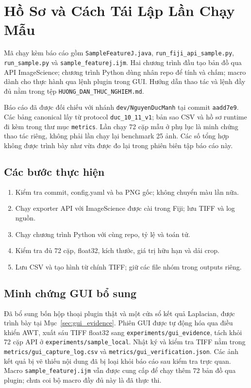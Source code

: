 \appendices
\section{Hồ Sơ và Cách Tái Lập Lần Chạy Mẫu}
Mã chạy kèm báo cáo gồm \texttt{SampleFeatureJ.java}, \texttt{run\_fiji\_api\_sample.py},
\texttt{run\_sample.py} và \texttt{sample\_featurej.ijm}.
Hai chương trình đầu tạo bản đồ qua API ImageScience; chương trình Python dùng
nhân repo để tính và chấm; macro dành cho thực hành qua lệnh plugin trong GUI.
Hướng dẫn thao tác và lệnh đầy đủ nằm trong tệp \texttt{HUONG\_DAN\_THUC\_NGHIEM.md}.

Báo cáo đã được đối chiếu với nhánh \texttt{dev/NguyenDucManh} tại commit
\texttt{aadd7e9}. Các bảng canonical lấy từ protocol \texttt{duc\_10\_11\_v1};
bản sao CSV và hồ sơ runtime đi kèm trong thư mục \texttt{metrics}. Lần chạy
72 cặp mẫu ở phụ lục là minh chứng thao tác riêng, không phải lần chạy lại
benchmark 25 ảnh. Các số tổng hợp không được trình bày như vừa được đo lại
trong phiên biên tập báo cáo này.

\subsection{Các bước thực hiện}
\begin{enumerate}
\item Kiểm tra commit, config.yaml và ba PNG gốc; không chuyển màu lần nữa.
\item Chạy exporter API với ImageScience được cài trong Fiji; lưu TIFF và log nguồn.
\item Chạy chương trình Python với cùng repo, tỷ lệ và toán tử.
\item Kiểm tra đủ 72 cặp, float32, kích thước, giá trị hữu hạn và dải crop.
\item Lưu CSV và tạo hình từ chính TIFF; giữ các file nhóm trong outputs riêng.
\end{enumerate}

\subsection{Minh chứng GUI bổ sung}
Đã bổ sung bốn hộp thoại plugin thật và một cửa sổ kết quả Laplacian,
được trình bày tại Mục~\ref{sec:gui_evidence}. Phiên GUI được tự động hóa
qua điều khiển AWT, xuất sáu TIFF float32 sang
\texttt{experiments/gui\_evidence}, tách khỏi 72 cặp API ở
\texttt{experiments/sample\_local}. Nhật ký và kiểm tra TIFF nằm trong
\texttt{metrics/gui\_capture\_log.csv} và
\texttt{metrics/gui\_verification.json}. Các ảnh kết quả bị vẽ thiếu nội dung
đã bị loại khỏi báo cáo sau kiểm tra trực quan.
Macro \texttt{sample\_featurej.ijm} vẫn được cung cấp để chạy thêm
72 bản đồ qua plugin; chưa coi bộ macro đầy đủ này là đã thực thi.

